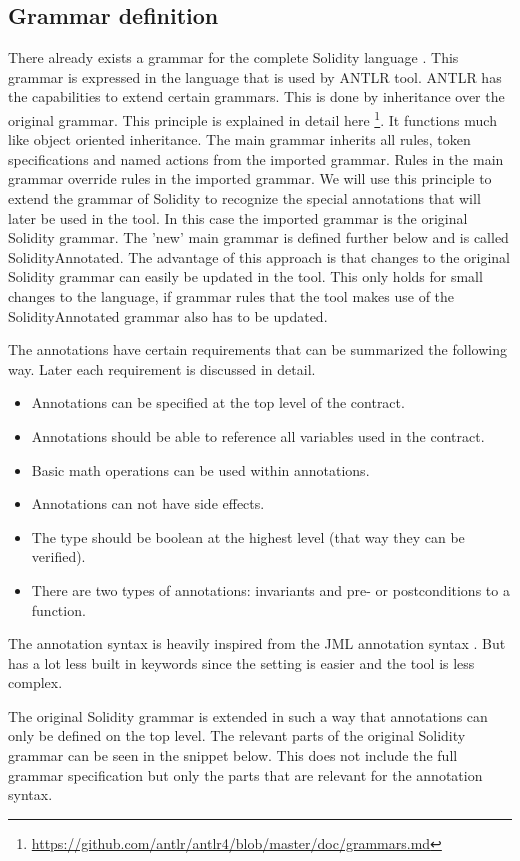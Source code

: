 \documentclass[a4paper]{article}
\begin{document}
\subsection{Grammar definition}
There already exists a grammar for the complete Solidity language \cite{antlroriginalgrammar}. This grammar is expressed in the language that is used by ANTLR tool. ANTLR has the capabilities to extend certain grammars. This is done by inheritance over the original grammar. This principle is explained in detail here \footnote{\url{https://github.com/antlr/antlr4/blob/master/doc/grammars.md}}. It functions much like object oriented inheritance. The main grammar inherits all rules, token specifications and named actions from the imported grammar. Rules in the main grammar override rules in the imported grammar. We will use this principle to extend the grammar of Solidity to recognize the special annotations that will later be used in the tool. In this case the imported grammar is the original Solidity grammar. The 'new' main grammar is defined further below and is called SolidityAnnotated. The advantage of this approach is that changes to the original Solidity grammar can easily be updated in the tool. This only holds for small changes to the language, if grammar rules that the tool makes use of the SolidityAnnotated grammar also has to be updated.\par
The annotations have certain requirements that can be summarized the following way. Later each requirement is discussed in detail.
\begin{itemize}
    \item Annotations can be specified at the top level of the contract.
    \item Annotations should be able to reference all variables used in the contract.
    \item Basic math operations can be used within annotations.
    \item Annotations can not have side effects.
    \item The type should be boolean at the highest level (that way they can be verified).
    \item There are two types of annotations: invariants and pre- or postconditions to a function.
\end{itemize}

The annotation syntax is heavily inspired from the JML annotation syntax \cite{leavens2008jml}. But has a lot less built in keywords since the setting is easier and the tool is less complex. \par
The original Solidity grammar is extended in such a way that annotations can only be defined on the top level. The relevant parts of the original Solidity grammar can be seen in the snippet below. This does not include the full grammar specification but only the parts that are relevant for the annotation syntax.
\end{document}
